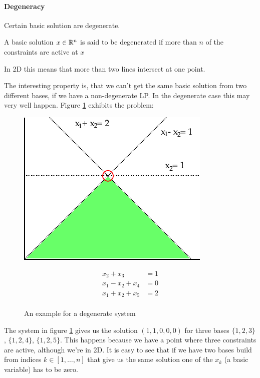 \paragraph*{Degeneracy}
Certain basic solution are degenerate. 
\begin{Def}[Degeneracy]
 A basic solution $x\in \mathbb{R}^n$ is said to be degenerated if more than $n$ of the constraints are active at $x$ 
\end{Def}
In 2D this means that more than two lines intersect at one point.

The interesting property is, that we can't get the same basic solution from two different bases, if we have a non-degenerate LP. In the degenerate case this may very well happen. Figure \ref{Fig:degenerateSystem} exhibits the problem:


\begin{figure}[hbt]
\begin{minipage}[hbt]{0.4\linewidth}
\includegraphics{./images/degenerateSystem.pdf}
\end{minipage}
\hfill
\begin{minipage}[hbt]{0.4\linewidth}
\begin{align*}
x_2 + x_3 &= 1\\
x_1 - x_2 +x_4 &=0\\
x_1 + x_2 +x_5 &= 2\\
\end{align*}
\end{minipage}
\caption{An example for a degenerate system}
\label{Fig:degenerateSystem}
\end{figure}

The system in figure \ref{Fig:degenerateSystem} gives us the solution $(1,1,0,0,0)$ for three bases $\{1,2,3\}$, $\{1,2,4\}$, $\{1,2,5\}$. This happens because we have a point where three constraints are active, although we're in 2D. It is easy to see that if we have two bases build from indices $k\in [1,\ldots,n]$ that give us the same solution one of the $x_k$ (a basic variable) has to be zero. %

